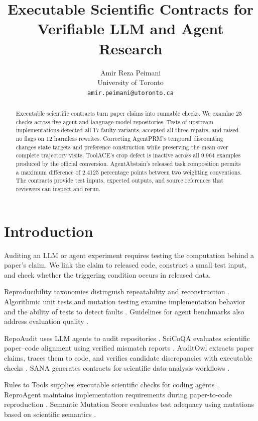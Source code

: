 \documentclass{article}
\title{Executable Scientific Contracts for Verifiable LLM and Agent Research}
\author{Amir Reza Peimani\\University of Toronto\\\texttt{amir.peimani@utoronto.ca}}
\begin{document}
\maketitle

\begin{abstract}
Executable scientific contracts turn paper claims into runnable checks. We examine 25 checks across five agent and language model repositories. Tests of upstream implementations detected all 17 faulty variants, accepted all three repairs, and raised no flags on 12 harmless rewrites. Correcting AgentPRM's temporal discounting changes state targets and preference construction while preserving the mean over complete trajectory visits. ToolACE's crop defect is inactive across all 9,964 examples produced by the official conversion. AgentAbstain's released task composition permits a maximum difference of 2.4125 percentage points between two weighting conventions. The contracts provide test inputs, expected outputs, and source references that reviewers can inspect and rerun.
\end{abstract}

\section{Introduction}
Auditing an LLM or agent experiment requires testing the computation behind a paper's claim. We link the claim to released code, construct a small test input, and check whether the triggering condition occurs in released data.

Reproducibility taxonomies distinguish repeatability and reconstruction \citep{tatman2018taxonomy}. Algorithmic unit tests and mutation testing examine implementation behavior and the ability of tests to detect faults \citep{raff2023algorithmic,just2014major,panichella2021mutation,tufano2019mutate}. Guidelines for agent benchmarks also address evaluation quality \citep{zhu2025agentbenchmarks}.

RepoAudit uses LLM agents to audit repositories \citep{guo2025repoaudit}. SciCoQA evaluates scientific paper--code alignment using verified mismatch reports \citep{baumgartner2026scicoqa}. AuditOwl extracts paper claims, traces them to code, and verifies candidate discrepancies with executable checks \citep{auditowl2026}. SANA generates contracts for scientific data-analysis workflows \citep{sana2026}.

Rules to Tools supplies executable scientific checks for coding agents \citep{ning2026rules}. ReproAgent maintains implementation requirements during paper-to-code reproduction \citep{hu2026reproagent}. Semantic Mutation Score evaluates test adequacy using mutations based on scientific semantics \citep{li2026semanticmutation}.
\end{document}
